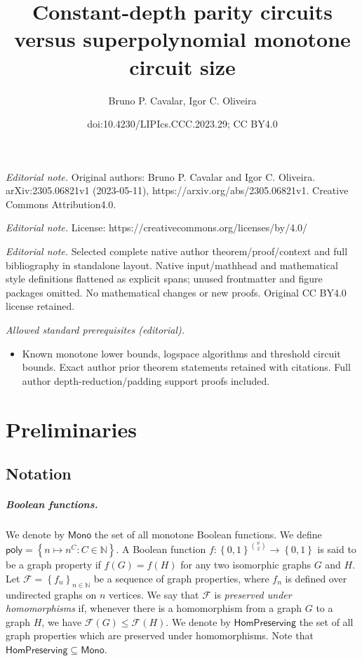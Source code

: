 \documentclass[10pt,a4paper]{article}
\title{Constant-depth parity circuits versus superpolynomial monotone circuit size}
\author{Bruno P. Cavalar, Igor C. Oliveira}
\date{doi:10.4230/LIPIcs.CCC.2023.29; CC BY4.0}
\newcommand{\poly}{\mathsf{poly}}
\newcommand{\monfns}{\mathsf{Mono}}
\newcommand{\HomPres}{\mathsf{HomPreserving}}
\def\sseq{\subseteq}
\newcommand{\set}[1]{\left\{#1\right\}}
\newcommand{\blt}{\set{0,1}}
\def\bbn{{\mathbb N}}
\def\calf{{\mathcal F}}
\begin{document}
\maketitle
\setcounter{section}{2}
\noindent\textit{Editorial note.} Original authors: Bruno P. Cavalar and Igor C. Oliveira. arXiv:2305.06821v1 (2023-05-11), https://arxiv.org/abs/2305.06821v1. Creative Commons Attribution4.0.\par\medskip
\noindent\textit{Editorial note.} License: https://creativecommons.org/licenses/by/4.0/\par\medskip
\noindent\textit{Editorial note.} Selected complete native author theorem/proof/context and full bibliography in standalone layout. Native input/mathhead and mathematical style definitions flattened as explicit spans; unused frontmatter and figure packages omitted. No mathematical changes or new proofs. Original CC BY4.0 license retained.\par\medskip
\noindent\textit{Allowed standard prerequisites (editorial).}\begin{itemize}
\item Known monotone lower bounds, logspace algorithms and threshold circuit bounds. Exact author prior theorem statements retained with citations. Full author depth-reduction/padding support proofs included.
\end{itemize}\medskip
\section{Preliminaries}

\subsection{Notation}

\subparagraph{Boolean functions.}

We denote by $\monfns$ the set of all monotone Boolean functions.
We define $\poly = \set{n \mapsto n^C : C \in \bbn}$.
A Boolean function
    $f : \blt^{\binom{n}{2}} \to \blt$ is said to be a graph property
    if $f(G) = f(H)$ for any two isomorphic graphs $G$ and $H$.
Let $\calf = \set{f_n}_{n \in \bbn}$
    be a sequence of graph properties, where $f_n$ is defined over undirected graphs on
    $n$ vertices.
    We say that $\calf$ is
    \emph{preserved under homomorphisms} if,
    whenever there is a homomorphism from a graph $G$ to a graph $H$,
    we have $\calf(G) \leq \calf(H)$.
    We denote by $\HomPres$ 
    the set of all 
    graph properties which are preserved under homomorphisms.
    Note that $\HomPres \sseq \monfns$.
\end{document}
